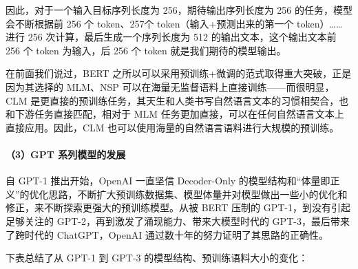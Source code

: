 \documentclass[
]{article}
\begin{document}
因此，对于一个输入目标序列长度为 256，期待输出序列长度为 256
的任务，模型会不断根据前 256 个 token、257个
token（输入+预测出来的第一个 token）\ldots\ldots{} 进行 256
次计算，最后生成一个序列长度为 512 的输出文本，这个输出文本前 256 个
token 为输入，后 256 个 token 就是我们期待的模型输出。

在前面我们说过，BERT
之所以可以采用预训练+微调的范式取得重大突破，正是因为其选择的 MLM、NSP
可以在海量无监督语料上直接训练------而很明显，CLM
是更直接的预训练任务，其天生和人类书写自然语言文本的习惯相契合，也和下游任务直接匹配，相对于
MLM 任务更加直接，可以在任何自然语言文本上直接应用。因此，CLM
也可以使用海量的自然语言语料进行大规模的预训练。

\paragraph{（3）GPT
系列模型的发展}\label{gpt-ux7cfbux5217ux6a21ux578bux7684ux53d1ux5c55}

自 GPT-1 推出开始，OpenAI 一直坚信 Decoder-Only
的模型结构和``体量即正义''的优化思路，不断扩大预训练数据集、模型体量并对模型做出一些小的优化和修正，来不断探索更强大的预训练模型。从被
BERT 压制的 GPT-1，到没有引起足够关注的
GPT-2，再到激发了涌现能力、带来大模型时代的 GPT-3，最后带来了跨时代的
ChatGPT，OpenAI 通过数十年的努力证明了其思路的正确性。

下表总结了从 GPT-1 到 GPT-3 的模型结构、预训练语料大小的变化：
\end{document}
